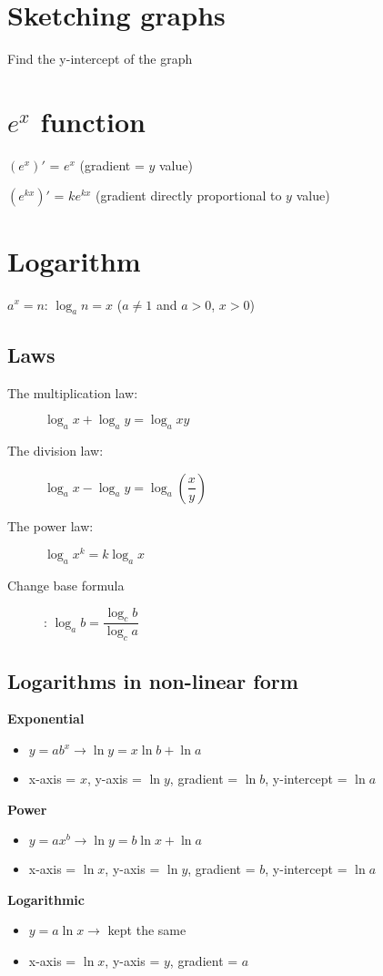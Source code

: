 \section{Sketching graphs}
Find the y-intercept of the graph

\section{$e^x$ function}
\begin{description}
    \item $(e^x)'$ = $e^x$ (gradient = $y$ value)
    \item $(e^{kx})'$ = $ke^{kx}$ (gradient directly proportional to $y$ value)
\end{description}

\section{Logarithm}
$a^x = n$: $\log_a n = x$ ($a\neq1$ and $a>0$, $x>0$)
\subsection{Laws}
\begin{description}
    \item[The multiplication law:] $\log_a x + \log_a y = \log_a xy$
    \item[The division law:] $\log_a x - \log_a y = \log_a (\dfrac{x}{y})$
    \item[The power law:] $\log_a x^k = k\log_a x$
    \item[Change base formula]: $\log_a b = \dfrac{\log_c b}{\log_c a}$
\end{description}

\subsection{Logarithms in non-linear form}
\textbf{Exponential}
\begin{itemize}
    \item $y=ab^x\rightarrow\ln y = x\ln b + \ln a$
    \item x-axis = $x$, y-axis = $\ln y$, gradient = $\ln b$, y-intercept = $\ln a$
\end{itemize}
\textbf{Power}
\begin{itemize}
    \item $y=ax^b\rightarrow\ln y = b\ln x + \ln a$
    \item x-axis = $\ln x$, y-axis = $\ln y$, gradient = $b$, y-intercept = $\ln a$
\end{itemize}
\textbf{Logarithmic}
\begin{itemize}
    \item $y=a\ln x\rightarrow$ kept the same
    \item x-axis = $\ln x$, y-axis = $y$, gradient = $a$
\end{itemize}